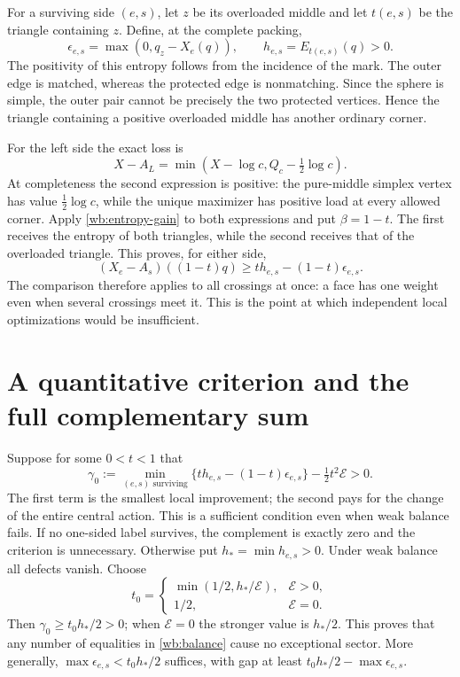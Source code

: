 For a surviving side $(e,s)$, let $z$ be its overloaded middle and let
$t(e,s)$ be the triangle containing $z$. Define, at the complete packing,
\begin{equation}\label{wb:defects}
 \epsilon_{e,s}=\max(0,q_z-X_e(q)),\qquad
 h_{e,s}=E_{t(e,s)}(q)>0.
\end{equation}
The positivity of this entropy follows from the incidence of the mark. The
outer edge is matched, whereas the protected edge is nonmatching.
Since the sphere is simple, the outer pair cannot be precisely the
two protected vertices. Hence the triangle containing a positive
overloaded middle has another ordinary corner.

For the left side the exact loss is
\[
 X-A_L=\min(X-\log c,Q_c-\tfrac12\log c).
\]
At completeness the second expression is positive: the pure-middle
simplex vertex has value $\tfrac12\log c$, while the unique maximizer
has positive load at every allowed corner. Apply
\eqref{wb:entropy-gain} to both expressions and put $\beta=1-t$.
The first receives the entropy of both triangles, while the second
receives that of the overloaded triangle. This proves, for either side,
\begin{equation}\label{wb:loss}
 (X_e-A_s)((1-t)q)
       \ge t h_{e,s}-(1-t)\epsilon_{e,s}.
\end{equation}
The comparison therefore applies to all crossings at once: a face has
one weight even when several crossings meet it. This is the point at
which independent local optimizations would be insufficient.

\section{A quantitative criterion and the full complementary sum}

Suppose for some $0<t<1$ that
\begin{equation}\label{wb:criterion}
 \gamma_0:=\min_{(e,s)\text{ surviving}}
        \{t h_{e,s}-(1-t)\epsilon_{e,s}\}
                    -\tfrac12t^2\mathcal E>0.
\end{equation}
The first term is the smallest local improvement; the second pays for
the change of the entire central action. This is a sufficient condition
even when weak balance fails. If no
one-sided label survives, the complement is exactly zero and the
criterion is unnecessary. Otherwise put $h_* =\min h_{e,s}>0$.
Under weak balance all defects vanish. Choose
\begin{equation}\label{wb:choice}
 t_0=\begin{cases}
       \min(1/2,h_*/\mathcal E),&\mathcal E>0,\\
       1/2,&\mathcal E=0.
     \end{cases}
\end{equation}
Then $\gamma_0\ge t_0h_*/2>0$; when $\mathcal E=0$ the stronger
value is $h_*/2$. This proves that any number of equalities in
\eqref{wb:balance} cause no exceptional sector. More generally,
$\max\epsilon_{e,s}<t_0h_*/2$ suffices, with gap at least
$t_0h_*/2-\max\epsilon_{e,s}$.

